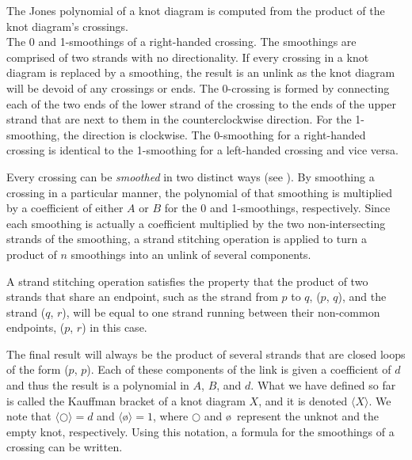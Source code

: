 \begin{paper}

The Jones polynomial of a knot diagram is computed from the product of the knot
diagram's crossings.\\

{The 0 and 1-smoothings of a right-handed crossing.
The smoothings are comprised of two strands with no directionality.
If every crossing in a knot diagram is replaced by a smoothing, the result is an
unlink as the knot diagram will be devoid of any crossings or ends.
The 0-crossing is formed by connecting each of the two ends of the lower strand
of the crossing to the ends of the upper strand that are next to them in the
counterclockwise direction.
For the 1-smoothing, the direction is clockwise.
The 0-smoothing for a right-handed crossing is identical to the 1-smoothing for
a left-handed crossing and vice versa.}

Every crossing can be \textit{smoothed} in two distinct ways (see
\figSmoothings).
By smoothing a crossing in a particular manner, the polynomial of that smoothing
is multiplied by a coefficient of either $A$ or $B$ for the 0 and 1-smoothings,
respectively.
Since each smoothing is actually a coefficient multiplied by the two
non-intersecting strands of the smoothing, a strand stitching operation is
applied to turn a product of $n$ smoothings into an unlink of several
components.

A strand stitching operation satisfies the property that the product of two
strands that share an endpoint, such as the strand from $p$ to $q$, ($p$, $q$),
and the strand ($q$, $r$), will be equal to one strand running between their
non-common endpoints, ($p$, $r$) in this case.

The final result will always be the product of several strands that are closed
loops of the form ($p$, $p$).
Each of these components of the link is given a coefficient of $d$ and thus the
result is a polynomial in $A$, $B$, and $d$.
What we have defined so far is called the Kauffman bracket of a knot diagram
$X$, and it is denoted $\langle X\rangle$.
We note that $\langle\bigcirc\rangle=d$ and $\langle$\o$\rangle=1$, where
$\bigcirc$ and \o~represent the unknot and the empty knot, respectively.
Using this notation, a formula for the smoothings of a crossing can be written.


\end{paper}
